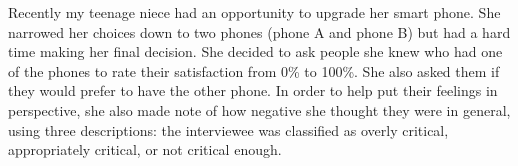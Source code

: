 \documentclass[addpoints]{examsetup}\usepackage[]{graphicx}\usepackage[]{color}
\begin{document}
\begin{questions}

\pagebreak

\question

Recently my teenage niece had an opportunity to upgrade her smart phone. 
She narrowed her choices down to two phones (phone A and phone B) but had a hard time making her final decision.
She decided to ask people she knew who had one of the phones to rate their satisfaction from 0\% to 100\%.
She also asked them if they would prefer to have the other phone.
In order to help put their feelings in perspective, she also made note of how negative she thought they were in general, 
using three descriptions: the interviewee was classified as overly critical, appropriately critical, or not critical enough. 

\end{questions}
\end{document}

